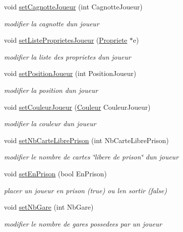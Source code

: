 \begin{DoxyCompactItemize}
void \hyperlink{classJoueur_a94c32aa334fd5bb3e4ddc96f5b77e1b6}{set\+Cagnotte\+Joueur} (int Cagnotte\+Joueur)
\begin{DoxyCompactList}\small\item\em modifier la cagnotte d\textquotesingle{}un joueur \end{DoxyCompactList}\item 
void \hyperlink{classJoueur_a18c5e436eb68fc995a32c27928e0966a}{set\+Liste\+Proprietes\+Joueur} (\hyperlink{classPropriete}{Propriete} $\ast$e)
\begin{DoxyCompactList}\small\item\em modifier la liste des proprietes d\textquotesingle{}un joueur \end{DoxyCompactList}\item 
void \hyperlink{classJoueur_a16ae199ab457026815521c0cd1e2cd9a}{set\+Position\+Joueur} (int Position\+Joueur)
\begin{DoxyCompactList}\small\item\em modifier la position d\textquotesingle{}un joueur \end{DoxyCompactList}\item 
void \hyperlink{classJoueur_a783f97724d36879e869bbbed3da7df1a}{set\+Couleur\+Joueur} (\hyperlink{classCouleur}{Couleur} Couleur\+Joueur)
\begin{DoxyCompactList}\small\item\em modifier la couleur d\textquotesingle{}un joueur \end{DoxyCompactList}\item 
void \hyperlink{classJoueur_ace62506abea09f7ce35ddf608faf3bf5}{set\+Nb\+Carte\+Libre\+Prison} (int Nb\+Carte\+Libre\+Prison)
\begin{DoxyCompactList}\small\item\em modifier le nombre de cartes \char`\"{}libere de prison\char`\"{} d\textquotesingle{}un joueur \end{DoxyCompactList}\item 
void \hyperlink{classJoueur_a44836db8ee97b5a43d9babd0601c66cf}{set\+En\+Prison} (bool En\+Prison)
\begin{DoxyCompactList}\small\item\em placer un joueur en prison (true) ou l\textquotesingle{}en sortir (false) \end{DoxyCompactList}\item 
void \hyperlink{classJoueur_a1cda809f3eb87380361472541e94ad72}{set\+Nb\+Gare} (int Nb\+Gare)
\begin{DoxyCompactList}\small\item\em modifier le nombre de gares possedees par un joueur \end{DoxyCompactList}\item 

\end{DoxyCompactItemize}
